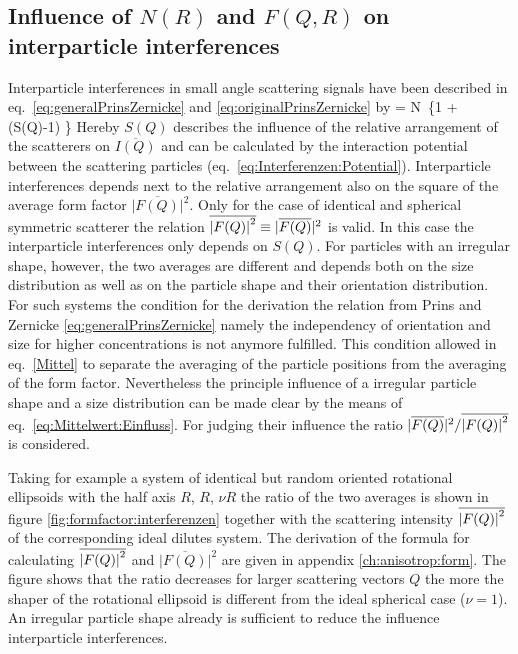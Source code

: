\subsection{Influence of $N(R)$ and $F(Q,R)$ on interparticle interferences}
\label{chap:Einfluss:N(R):F(Q)}

Interparticle interferences in small angle scattering signals have been described in
eq.\  \ref{eq:generalPrinsZernicke}  and \ref{eq:originalPrinsZernicke} by
\BE
{} %
= N\, \left\{1 +
  \, (S(Q)-1) \right\}
\label{eq:Mittelwert:Einfluss}
\EE
Hereby $S(Q)$ describes the influence of the relative arrangement of the
scatterers on $\overline{I(Q)}$ and can be calculated by the interaction
potential between the scattering particles (eq.\ \ref{eq:Interferenzen:Potential}).
Interparticle interferences depends next to the relative arrangement also
on the square of the average form factor {\small $\vert{\overline{F(Q)}}\vert^2$}.
Only for the case of identical and spherical symmetric scatterer the relation
{\small $\overline{\abs{F(Q)}^2} \equiv \vert{\overline{F(Q)}}\vert^2$} is valid.
In this case the interparticle interferences only depends on $S(Q)$. For particles
with an irregular shape, however, the two averages are different and depends both on
the size distribution as well as on the particle shape and their orientation distribution.
For such systems the condition for the derivation the relation from Prins and Zernicke
\ref{eq:generalPrinsZernicke} namely the independency of orientation and size for higher
concentrations is not anymore fulfilled. This condition allowed in eq.\ \ref{Mittel}
to separate the averaging of the particle positions from the averaging of the form factor.
Nevertheless the principle influence of a irregular particle shape and a size distribution
can be made clear by the means of eq.\ \ref{eq:Mittelwert:Einfluss}.
For judging their influence the ratio
{\small $\vert{\overline{F(Q)}}\vert^2/\overline{\abs{F(Q)}^2}$} is considered.

Taking for example a system of identical but random oriented rotational ellipsoids
with the half axis $R$, $R$, $\nu R$ the ratio of the two averages
is shown in figure \ref{fig:formfactor:interferenzen} together with the scattering
intensity {\small $\overline{\abs{F(Q)}^2}$} of the corresponding ideal dilutes system.
The derivation of the formula for calculating  {\small $\overline{\abs{F(Q)}^2}$} and
{\small $\vert{\overline{F(Q)}}\vert^2$} are given in appendix \ref{ch:anisotrop:form}.
The figure shows that the ratio decreases for larger scattering vectors $Q$
the more the shaper of the rotational ellipsoid is different from the ideal spherical
case ($\nu=1$). An irregular particle shape already is sufficient to reduce the influence
interparticle interferences.

